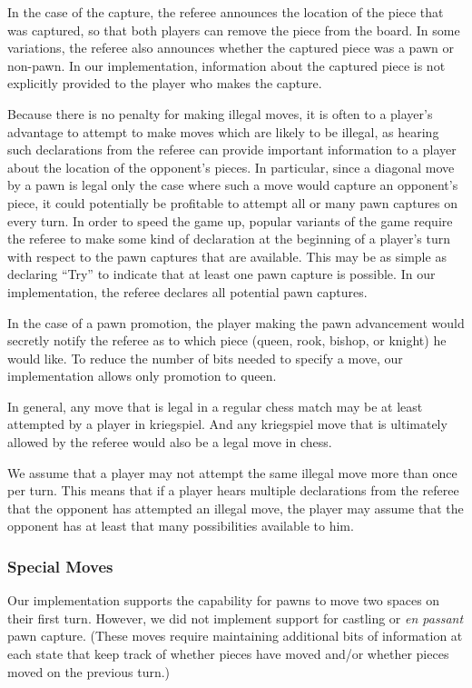 \documentclass[11pt]{article}
\begin{document}
In the case of the capture, the referee announces the location of the piece that was captured, so that both players can
remove the piece from the board.  In some variations, the referee also announces whether the captured piece was a pawn
or non-pawn.  In our implementation, information about the captured piece is not explicitly provided to the player who
makes the capture.

Because there is no penalty for making illegal moves, it is often to a player's advantage to attempt to make moves which
are likely to be illegal, as hearing such declarations from the referee can provide important information to a player
about the location of the opponent's pieces.  In particular, since a diagonal move by a pawn is legal only the case
where such a move would capture an opponent's piece, it could potentially be profitable to attempt all or many pawn
captures on every turn.  In order to speed the game up, popular variants of the game require the referee to make some
kind of declaration at the beginning of a player's turn with respect to the pawn captures that are available.  This may
be as simple as declaring ``Try'' to indicate that at least one pawn capture is possible.  In our implementation, the
referee declares all potential pawn captures.

In the case of a pawn promotion, the player making the pawn advancement would secretly notify the referee as to which
piece (queen, rook, bishop, or knight) he would like.  To reduce the number of bits needed to specify a move, our
implementation allows only promotion to queen. 

In general, any move that is legal in a regular chess match may be at least attempted by a player in kriegspiel.  And
any kriegspiel move that is ultimately allowed by the referee would also be a legal move in chess.    

We assume that a player may not attempt the same illegal move more than once per turn.  This means that if a player
hears multiple declarations from the referee that the opponent has attempted an illegal move, the player may assume that
the opponent has at least that many possibilities available to him.

\subsubsection{Special Moves}
Our implementation supports the capability for pawns to move two spaces on their first turn.  However, we did not
implement support for castling or {\em en passant} pawn capture.  (These moves require maintaining additional bits of
information at each state that keep track of whether pieces have moved and/or whether pieces moved on the previous
turn.) 
\end{document}

